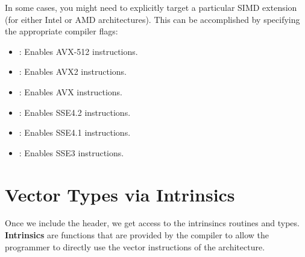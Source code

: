 In some cases, you might need to explicitly target a particular SIMD extension (for either Intel or AMD architectures). This can be accomplished by specifying the appropriate compiler flags:

\begin{itemize}[noitemsep]
    \item \textbf{}: Enables AVX-512 instructions.
    \item \textbf{}: Enables AVX2 instructions.
    \item \textbf{}: Enables AVX instructions.
    \item \textbf{}: Enables SSE4.2 instructions.
    \item \textbf{}: Enables SSE4.1 instructions.
    \item \textbf{}: Enables SSE3 instructions.
\end{itemize}

\vspace{-0.3em}

\section{Vector Types via Intrinsics}

\vspace{-0.3em}

Once we include the  header, we get access to the intrinsincs routines and types. \textbf{Intrinsics} are functions that are provided by the compiler to allow the programmer to directly use the vector instructions of the architecture.

\vspace{-1em}

